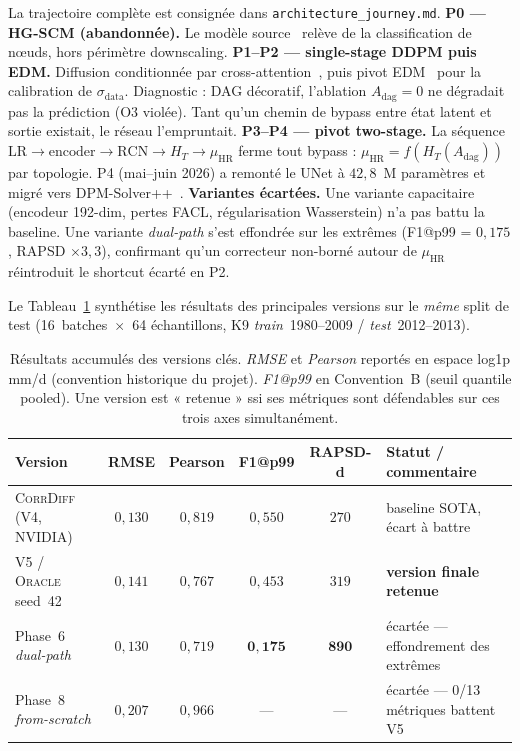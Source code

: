 \documentclass[14pt,a4paper,openany]{extreport}
\theoremstyle{definition}
\newcommand{\Oracle}{\textsc{Oracle}}
\newcommand{\CorrDiff}{\textsc{CorrDiff}}
\newcommand{\LR}{\ensuremath{\text{LR}}}
\newcommand{\HR}{\ensuremath{\text{HR}}}
\newcommand{\muHR}{\ensuremath{\mu_{\HR}}}
\newcommand{\Adag}{\ensuremath{A_{\mathrm{dag}}}}
\newcommand{\HT}{\ensuremath{H_T}}
\begin{document}
La trajectoire complète est consignée dans \texttt{architecture\_journey.md}. \textbf{P0 --- HG-SCM (abandonnée).} Le modèle source~\cite{lin_hgscm_2023} relève de la classification de n\oe uds, hors périmètre downscaling. \textbf{P1--P2 --- single-stage DDPM puis EDM.} Diffusion conditionnée par cross-attention~\cite{ho_ddpm_2020}, puis pivot EDM~\cite{karras_edm_2022} pour la calibration de $\sigma_{\mathrm{data}}$. Diagnostic : DAG décoratif, l'ablation $\Adag=0$ ne dégradait pas la prédiction (O3 violée). Tant qu'un chemin de bypass entre état latent et sortie existait, le réseau l'empruntait. \textbf{P3--P4 --- pivot two-stage.} La séquence $\LR \to \mathrm{encoder} \to \mathrm{RCN} \to \HT \to \muHR$ ferme tout bypass : $\muHR = f(\HT(\Adag))$ par topologie. P4 (mai--juin 2026) a remonté le UNet à $42{,}8$~M paramètres et migré vers DPM-Solver++~\cite{lu_dpmpp_2022}. \textbf{Variantes écartées.} Une variante capacitaire (encodeur 192-dim, pertes FACL, régularisation Wasserstein) n'a pas battu la baseline. Une variante \emph{dual-path} s'est effondrée sur les extrêmes (F1@p99 = $0{,}175$, RAPSD $\times 3{,}3$), confirmant qu'un correcteur non-borné autour de $\muHR$ réintroduit le shortcut écarté en P2.

Le Tableau~\ref{tab:exp-traj-versions} synthétise les résultats des principales versions sur le \emph{même} split de test (16~batches~$\times$~64 échantillons, K9 \emph{train}~1980--2009 / \emph{test}~2012--2013).

\begin{table}[H]
\centering
\small
\caption{Résultats accumulés des versions clés. \emph{RMSE} et \emph{Pearson} reportés en espace log1p mm/d (convention historique du projet). \emph{F1@p99} en Convention~B (seuil quantile pooled). Une version est « retenue » ssi ses métriques sont défendables sur ces trois axes simultanément.}
\label{tab:exp-traj-versions}
\begin{tabularx}{\linewidth}{l c c c c X}
\toprule
\textbf{Version} & \textbf{RMSE} & \textbf{Pearson} & \textbf{F1@p99} & \textbf{RAPSD-d} & \textbf{Statut / commentaire} \\
\midrule
\CorrDiff{} (V4, NVIDIA) & $0{,}130$ & $0{,}819$ & $0{,}550$ & $270$ & baseline SOTA, écart à battre \\
V5 / \Oracle{} seed~42 & $0{,}141$ & $0{,}767$ & $0{,}453$ & $319$ & \textbf{version finale retenue} \\
Phase~6 \emph{dual-path} & $0{,}130$ & $0{,}719$ & $\mathbf{0{,}175}$ & $\mathbf{890}$ & écartée --- effondrement des extrêmes \\
Phase~8 \emph{from-scratch} & $0{,}207$ & $0{,}966$ & --- & --- & écartée --- 0/13 métriques battent V5 \\
\bottomrule
\end{tabularx}
\end{table}
\end{document}
